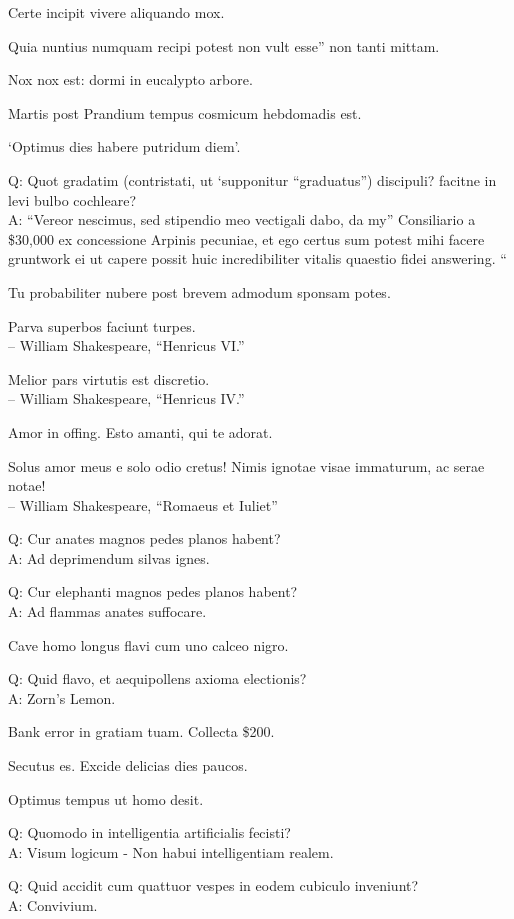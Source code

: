\documentclass[titlepage,12pt]{memoir}
\begin{document}
Certe incipit vivere aliquando mox.

Quia nuntius numquam recipi potest non vult esse”
non tanti mittam.

Nox nox est: dormi in eucalypto arbore.

Martis post Prandium tempus cosmicum hebdomadis est.

‘Optimus dies habere putridum diem’.

Q: Quot gradatim (contristati, ut ‘supponitur “graduatus”) discipuli?
facitne in levi bulbo cochleare?\\
A: “Vereor nescimus, sed stipendio meo vectigali dabo, da my”
Consiliario a \$30,000 ex concessione Arpinis pecuniae, et ego certus sum
potest mihi facere gruntwork ei ut capere possit
huic incredibiliter vitalis quaestio fidei answering. “

Tu probabiliter nubere post brevem admodum sponsam potes.

Parva superbos faciunt turpes.
\\-- William Shakespeare, “Henricus VI.”

Melior pars virtutis est discretio.
\\-- William Shakespeare, “Henricus IV.”

Amor in offing. Esto amanti, qui te adorat.

Solus amor meus e solo odio cretus!
Nimis ignotae visae immaturum, ac serae notae!
\\-- William Shakespeare, “Romaeus et Iuliet”

Q: Cur anates magnos pedes planos habent?\\
A: Ad deprimendum silvas ignes.

Q: Cur elephanti magnos pedes planos habent?\\
A: Ad flammas anates suffocare.

Cave homo longus flavi cum uno calceo nigro.

Q: Quid flavo, et aequipollens axioma electionis?\\
A: Zorn’s Lemon.

Bank error in gratiam tuam. Collecta \$200.

Secutus es. Excide delicias dies paucos.

Optimus tempus ut homo desit.

Q: Quomodo in intelligentia artificialis fecisti?\\
A: Visum logicum - Non habui intelligentiam realem.

Q: Quid accidit cum quattuor vespes in eodem cubiculo inveniunt?\\
A: Convivium.
\end{document}
